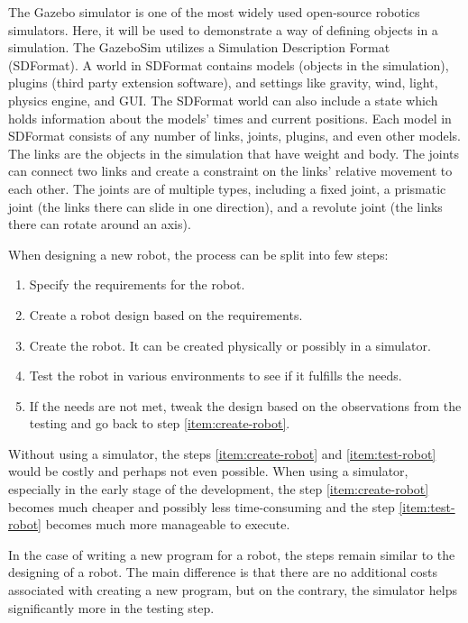 \documentclass[
  printed, %
  color,   %
  notable, %
  oneside, %
  nolof,   %
  nolot,   %
  nocover,
]{fithesis3}
\begin{document}
The Gazebo simulator\cite{gazebo} is one of the most widely used open-source robotics simulators.
Here, it will be used to demonstrate a way of defining objects in a simulation.
The GazeboSim utilizes a Simulation Description Format (SDFormat)\cite{sdf}.
A world in SDFormat contains models (objects in the simulation), plugins (third party extension software), and settings like gravity, wind, light, physics engine, and GUI.
The SDFormat world can also include a state which holds information about the models' times and current positions.
Each model in SDFormat consists of any number of links, joints, plugins, and even other models.
The links are the objects in the simulation that have weight and body.
The joints can connect two links and create a constraint on the links' relative movement to each other.
The joints are of multiple types, including a fixed joint, a prismatic joint (the links there can slide in one direction), and a revolute joint (the links there can rotate around an axis).

When designing a new robot, the process can be split into few steps:
\begin{enumerate}
    \item Specify the requirements for the robot.
    \item Create a robot design based on the requirements.
    \item Create the robot.\label{item:create-robot}
    It can be created physically or possibly in a simulator.
    \item Test the robot in various environments to see if it fulfills the needs.\label{item:test-robot}
    \item If the needs are not met, tweak the design based on the observations from the testing and go back to step \ref{item:create-robot}.
\end{enumerate}
Without using a simulator, the steps \ref{item:create-robot} and \ref{item:test-robot} would be costly and perhaps not even possible.
When using a simulator, especially in the early stage of the development, the step \ref{item:create-robot} becomes much cheaper and possibly less time-consuming and the step \ref{item:test-robot} becomes much more manageable to execute.

In the case of writing a new program for a robot, the steps remain similar to the designing of a robot.
The main difference is that there are no additional costs associated with creating a new program, but on the contrary, the simulator helps significantly more in the testing step.
\end{document}
